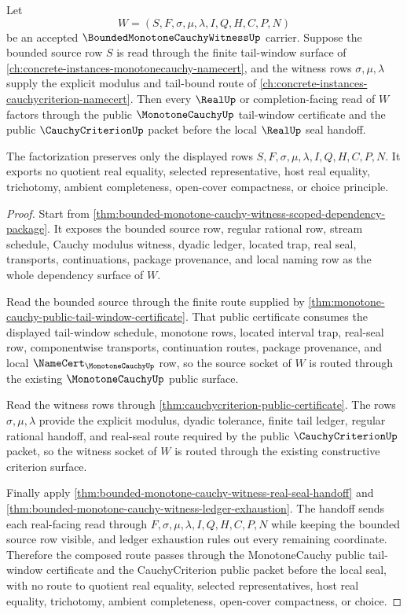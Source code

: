 \begin{theorem}
\label{thm:bounded-monotone-witness-monotone-cauchy-criterion-bridge}
Let
$$
W=(S,F,\sigma,\mu,\lambda,I,Q,H,C,P,N)
$$
be an accepted $\BoundedMonotoneCauchyWitnessUp$ carrier. Suppose the bounded source row $S$ is read through the finite tail-window surface of \autoref{ch:concrete-instances-monotonecauchy-namecert}, and the witness rows $\sigma,\mu,\lambda$ supply the explicit modulus and tail-bound route of \autoref{ch:concrete-instances-cauchycriterion-namecert}. Then every $\RealUp$ or completion-facing read of $W$ factors through the public $\MonotoneCauchyUp$ tail-window certificate and the public $\CauchyCriterionUp$ packet before the local $\RealUp$ seal handoff.

The factorization preserves only the displayed rows $S,F,\sigma,\mu,\lambda,I,Q,H,C,P,N$. It exports no quotient real equality, selected representative, host real equality, trichotomy, ambient completeness, open-cover compactness, or choice principle.
\end{theorem}
\begin{proof}
Start from \autoref{thm:bounded-monotone-cauchy-witness-scoped-dependency-package}. It exposes the bounded source row, regular rational row, stream schedule, Cauchy modulus witness, dyadic ledger, located trap, real seal, transports, continuations, package provenance, and local naming row as the whole dependency surface of $W$.

Read the bounded source through the finite route supplied by \autoref{thm:monotone-cauchy-public-tail-window-certificate}. That public certificate consumes the displayed tail-window schedule, monotone rows, located interval trap, real-seal row, componentwise transports, continuation routes, package provenance, and local $\NameCert_{\MonotoneCauchyUp}$ row, so the source socket of $W$ is routed through the existing $\MonotoneCauchyUp$ public surface.

Read the witness rows through \autoref{thm:cauchycriterion-public-certificate}. The rows $\sigma,\mu,\lambda$ provide the explicit modulus, dyadic tolerance, finite tail ledger, regular rational handoff, and real-seal route required by the public $\CauchyCriterionUp$ packet, so the witness socket of $W$ is routed through the existing constructive criterion surface.

Finally apply \autoref{thm:bounded-monotone-cauchy-witness-real-seal-handoff} and \autoref{thm:bounded-monotone-cauchy-witness-ledger-exhaustion}. The handoff sends each real-facing read through $F,\sigma,\mu,\lambda,I,Q,H,C,P,N$ while keeping the bounded source row visible, and ledger exhaustion rules out every remaining coordinate. Therefore the composed route passes through the MonotoneCauchy public tail-window certificate and the CauchyCriterion public packet before the local seal, with no route to quotient real equality, selected representatives, host real equality, trichotomy, ambient completeness, open-cover compactness, or choice.
\end{proof}

